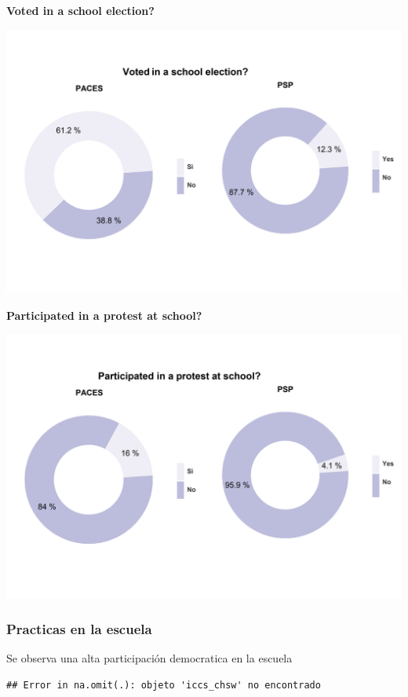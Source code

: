 \documentclass[12pt,twoside]{templates/facsothesis}
\begin{document}
\textbf{Voted in a school election?}

\includegraphics{output/plottr3.png}

\textbf{Participated in a protest at school?}

\includegraphics{output/plottr4.png}

\hypertarget{practicas-en-la-escuela}{%
\subsubsection{Practicas en la escuela}\label{practicas-en-la-escuela}}

Se observa una alta participación democratica en la escuela

\begin{verbatim}
## Error in na.omit(.): objeto 'iccs_chsw' no encontrado
\end{verbatim}
\end{document}
